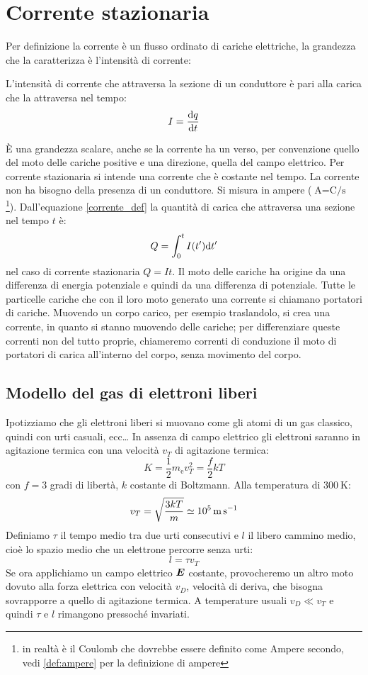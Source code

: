 \chapter{Corrente stazionaria}
\minitoc
Per definizione la corrente è un flusso ordinato di cariche elettriche, la grandezza che la caratterizza è l'intensità di corrente:
\begin{Def}
  L'intensità di corrente che attraversa la sezione di un conduttore è pari alla carica che la attraversa nel tempo:
  \begin{equation}
    I=\frac{\mathrm{d} q}{\mathrm{d} t}
    \label{corrente_def}
  \end{equation}
\end{Def}
\`E una grandezza scalare, anche se la corrente ha un verso, per convenzione quello del moto delle cariche positive e una direzione, quella del campo elettrico. Per corrente stazionaria si intende una corrente che è costante nel tempo. La corrente non ha bisogno della presenza di un conduttore. Si misura in ampere ($\si{\ampere} = \si{\coulomb\per\second}$ \footnote{in realtà è il Coulomb che dovrebbe essere definito come Ampere secondo, vedi \ref{def:ampere} per la definizione di ampere}). Dall'equazione \eqref{corrente_def} la quantità di carica che attraversa una sezione nel tempo $t$ è:
\begin{equation}
  Q=\int_0^t I(t')\mathrm{d} t'
\end{equation}
nel caso di corrente stazionaria $Q=It$. Il moto delle cariche ha origine da una differenza di energia potenziale e quindi da una differenza di potenziale. Tutte le particelle cariche che con il loro moto generato una corrente si chiamano portatori di cariche. Muovendo un corpo carico, per esempio traslandolo, si crea una corrente, in quanto si stanno muovendo delle cariche; per differenziare queste correnti non del tutto proprie, chiameremo correnti di conduzione il moto di portatori di carica all'interno del corpo, senza movimento del corpo.
\section{Modello del gas di elettroni liberi}
Ipotizziamo che gli elettroni liberi si muovano come gli atomi di un gas classico, quindi con urti casuali, ecc\ldots
In assenza di campo elettrico gli elettroni saranno in agitazione termica con una velocità $v_T$ di agitazione termica:
\[K=\frac{1}{2}m_{\mathrm{e}}v_T^2=\frac{f}{2}kT\]
con $f=3$ gradi di libertà, $k$ costante di Boltzmann. Alla temperatura di $\SI{300}{\kelvin}$:
\[v_T=\sqrt{\frac{3kT}{m}}\simeq \SI{E5}{\metre\per\second}\]
Definiamo $\tau$ il tempo medio tra due urti consecutivi e $l$ il libero cammino medio, cioè lo spazio medio che un elettrone percorre senza urti:
\[l = \tau v_T\]
Se ora applichiamo un campo elettrico $\boldsymbol{E}$ costante, provocheremo un altro moto dovuto alla forza elettrica con velocità $v_D$, velocità di deriva, che bisogna sovrapporre a quello di agitazione termica. A temperature usuali $v_D\ll v_T$ e quindi $\tau$ e $l$ rimangono pressoché invariati.
